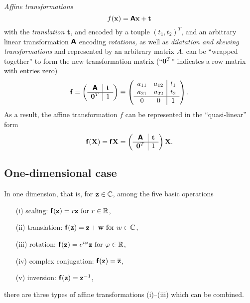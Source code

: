 {\em Affine transformations}
\begin{equation}
f({\bf x})
=   \textsf{\textbf{A}}{\bf x} + {\bf t}
\end{equation}
with the {\em translation}
  ${\bf t}$, and encoded by a touple $(t_1,t_2)^T$,
and an arbitrary linear transformation
$\textsf{\textbf{A}}$
encoding {\em rotations,} as well as {\em dilatation  and skewing transformations}
and represented by an arbitrary matrix $A$,
can be ``wrapped together'' to form the new transformation matrix
(``${\bf 0}^T$'' indicates a row matrix with entries zero)
\begin{equation}
\textsf{\textbf{f}}=
\left(
\begin{array}{c|cccc}
\textsf{\textbf{A}}&{\bf t}\\
\hline
{\bf 0}^T&1
\end{array}
\right)
\equiv
\left(
\begin{array}{cc|ccc}
a_{11}&a_{12}&{t}_1\\
a_{21}&a_{22}&{t}_2\\
\hline
0&0&1
\end{array}
\right)
.
\end{equation}
As a result, the affine transformation $f$ can be represented in the ``quasi-linear'' form
\begin{equation}
\textsf{\textbf{f}}({\bf X})
=
\textsf{\textbf{f}}{\bf X}
=
\left(
\begin{array}{c|cccc}
\textsf{\textbf{A}}&{\bf t}\\
\hline
{\bf 0}^T&1
\end{array}
\right)
{\bf X}
.
\end{equation}

\subsection{One-dimensional case}
In {one dimension}, that is,  for ${\bf z}\in {\Bbb C}$, among the five basic operations
\begin{itemize}
\item[(i)] scaling:  $\textsf{\textbf{f}}({\bf z}) = r  {\bf z}  \textrm{ for } r\in {\Bbb R}$,
\item[(ii)] translation:  $\textsf{\textbf{f}}({\bf z}) = {\bf z} + {\bf w}  \textrm{ for } w\in {\Bbb C}$,
\item[(iii)] rotation: $ \textsf{\textbf{f}}({\bf z}) = e^{i\varphi}{\bf z}    \textrm{ for } \varphi\in {\Bbb R}$,
\item[(iv)] complex conjugation: $\textsf{\textbf{f}}({\bf z}) = \overline{{\bf z}}$,
\item[(v)] inversion: $\textsf{\textbf{f}}({\bf z}) = {\bf z}^{-1}$,
\end{itemize}
there are three types of
affine transformations (i)--(iii)  which can be combined.

